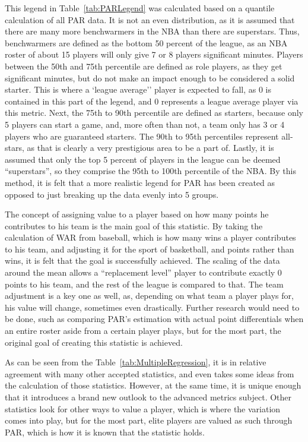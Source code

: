 \documentclass[12pt]{article}
\begin{document}
This legend in Table~\ref{tab:PARLegend} was calculated based on a 
quantile 
calculation of all PAR 
data. It is not an even distribution, as 
it is assumed that there are many more benchwarmers in the NBA than 
there are superstars. Thus, 
benchwarmers are defined as the bottom 50 percent of the league, as an 
NBA roster of about 15 players 
will only give 7 or 8 players significant minutes. Players between the 50th 
and 75th percentile are defined 
as role players, as they get significant minutes, but do not make an impact 
enough to be considered a solid 
starter. This is where  a `league average'' player is expected to fall, as 0 is 
contained in this part of the 
legend, and 0 represents a league average player via this metric. Next, 
the 75th to 90th percentile are 
defined as starters, because only 5 players can start a game, and, more 
often than not, a team only has 3 
or 4 players who are guaranteed starters. The 90th to 95th percentiles 
represent all-stars, as that is clearly a 
very prestigious area to be a part of. Lastly, it is assumed that only the top 
5 percent of players in the 
league can be deemed ``superstars'', so they comprise the 95th to 100th 
percentile of the NBA. By this 
method, it is felt that a more realistic legend for PAR has been created as 
opposed to just breaking up the 
data evenly into 5 groups.

The concept of assigning value to a player based on how many points he 
contributes to his team is the main goal of this statistic. By taking the 
calculation of WAR from baseball, which is how many wins a player 
contributes to his team, and adjusting it for the sport of basketball, and 
points rather than wins, it is felt that the goal is successfully achieved. The 
scaling of the data around the mean allows a ``replacement level'' player 
to contribute exactly 0 points to his team, and the rest of the league is 
compared to that. The team adjustment is a key one as well, as, 
depending on what team a player plays for, his value will change, 
sometimes even drastically. Further research would need to be done, 
such as comparing PAR's estimation with actual point differentials when 
an entire roster aside from a certain player plays, but for the most part, 
the original goal of creating this statistic is achieved.

As can be seen from the 
Table~\ref{tab:MultipleRegression}, it is in relative agreement with many 
other accepted statistics, and even takes some ideas from the calculation 
of those statistics. However, at the same time, it is unique enough that it 
introduces a brand new outlook to the advanced metrics subject. Other 
statistics look for other ways to value a player, which is where the 
variation comes into play, but for the most part, elite players are valued as 
such through PAR, which is how it is known that the statistic holds.
\end{document}
